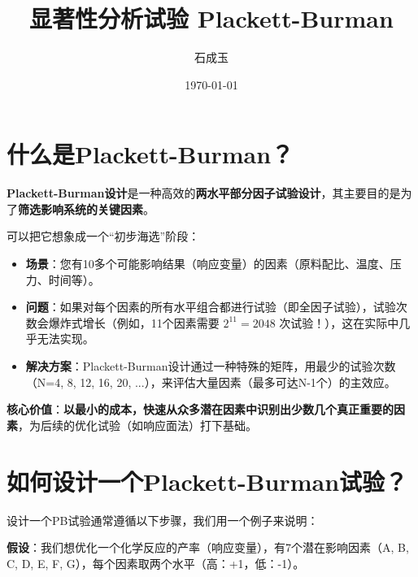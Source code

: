 \documentclass[fontset=windows,12pt]{ctexart}
\title{显著性分析试验 Plackett-Burman}
\author{石成玉}
\date{\today}
\begin{document}
\maketitle

\tableofcontents

\section{什么是Plackett-Burman？}

\textbf{Plackett-Burman设计}是一种高效的\textbf{两水平部分因子试验设计}，其主要目的是为了\textbf{筛选影响系统的关键因素}。

可以把它想象成一个“初步海选”阶段：

\begin{itemize}
	\item \textbf{场景}：您有10多个可能影响结果（响应变量）的因素（原料配比、温度、压力、时间等）。
	\item \textbf{问题}：如果对每个因素的所有水平组合都进行试验（即全因子试验），试验次数会爆炸式增长（例如，11个因素需要 \(2^{11} = 2048\) 次试验！），这在实际中几乎无法实现。
	\item \textbf{解决方案}：Plackett-Burman设计通过一种特殊的矩阵，用最少的试验次数（N=4, 8, 12, 16, 20, ...），来评估大量因素（最多可达N-1个）的主效应。
\end{itemize}

\textbf{核心价值}：\textbf{以最小的成本，快速从众多潜在因素中识别出少数几个真正重要的因素}，为后续的优化试验（如响应面法）打下基础。

\section{如何设计一个Plackett-Burman试验？}

设计一个PB试验通常遵循以下步骤，我们用一个例子来说明：

\textbf{假设}：我们想优化一个化学反应的产率（响应变量），有7个潜在影响因素（A, B, C, D, E, F, G），每个因素取两个水平（高：+1，低：-1）。
\end{document}
